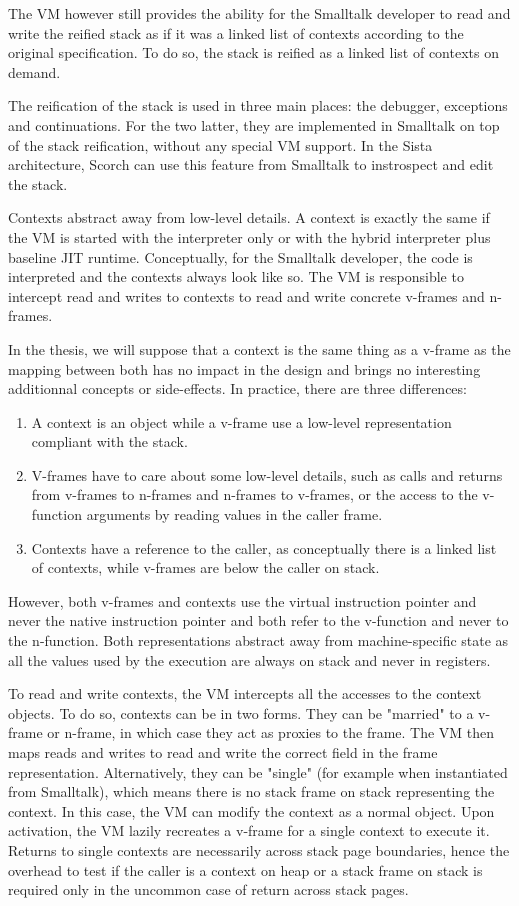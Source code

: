 \documentclass[a4paper,12pt,twoside]{../includes/ThesisStyle}
\begin{document}
The VM however still provides the ability for the Smalltalk developer to read and write the reified stack as if it was a linked list of contexts according to the original specification. To do so, the stack is reified as a linked list of contexts on demand. 

The reification of the stack is used in three main places: the debugger, exceptions and continuations. For the two latter, they are implemented in Smalltalk on top of the stack reification, without any special VM support. In the Sista architecture, Scorch can use this feature from Smalltalk to instrospect and edit the stack.

Contexts abstract away from low-level details. A context is exactly the same if the VM is started with the interpreter only or with the hybrid interpreter plus baseline JIT runtime. Conceptually, for the Smalltalk developer, the code is interpreted and the contexts always look like so. The VM is responsible to intercept read and writes to contexts to read and write concrete v-frames and n-frames.

In the thesis, we will suppose that a context is the same thing as a v-frame as the mapping between both has no impact in the design and brings no interesting additionnal concepts or side-effects. In practice, there are three differences:
\begin{enumerate}
	\item A context is an object while a v-frame use a low-level representation compliant with the stack.
	\item V-frames have to care about some low-level details, such as calls and returns from v-frames to n-frames and n-frames to v-frames, or the access to the v-function arguments by reading values in the caller frame. 
	\item Contexts have a reference to the caller, as conceptually there is a linked list of contexts, while v-frames are below the caller on stack.
\end{enumerate}
However, both v-frames and contexts use the virtual instruction pointer and never the native instruction pointer and both refer to the v-function and never to the n-function. Both representations abstract away from machine-specific state as all the values used by the execution are always on stack and never in registers.

To read and write contexts, the VM intercepts all the accesses to the context objects. To do so, contexts can be in two forms. They can be "married" to a v-frame or n-frame, in which case they act as proxies to the frame. The VM then maps reads and writes to read and write the correct field in the frame representation. Alternatively, they can be "single" (for example when instantiated from Smalltalk), which means there is no stack frame on stack representing the context. In this case, the VM can modify the context as a normal object. Upon activation, the VM lazily recreates a v-frame for a single context to execute it. Returns to single contexts are necessarily across stack page boundaries, hence the overhead to test if the caller is a context on heap or a stack frame on stack is required only in the uncommon case of return across stack pages. 
\end{document}
